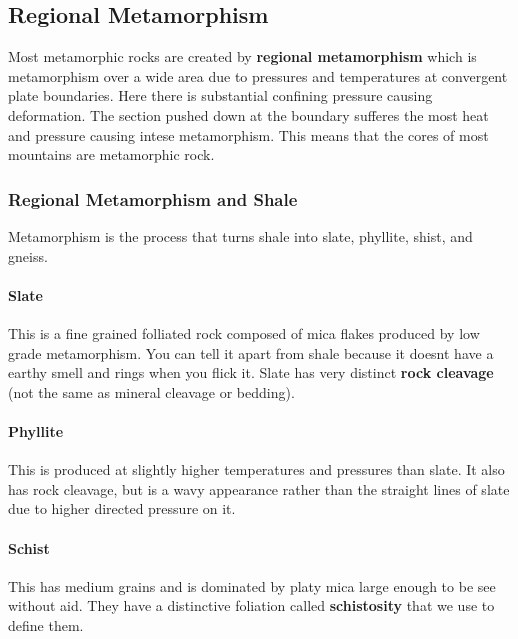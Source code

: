 \documentclass{article}
\begin{document}
\subsection{Regional Metamorphism} %
\label{sub:regional_metamorphism}
Most metamorphic rocks are created by \textbf{regional metamorphism} which is metamorphism over a wide area due to pressures and temperatures at convergent plate boundaries. Here there is substantial confining pressure causing deformation. The section pushed down at the boundary sufferes the most heat and pressure causing intese metamorphism. This means that the cores of most mountains are metamorphic rock.

\subsubsection{Regional Metamorphism and Shale} %
\label{sub:regional_metamorphism_and_shale}
Metamorphism is the process that turns shale into slate, phyllite, shist, and gneiss.

\paragraph{Slate} %
\label{par:slate}
This is a fine grained folliated rock composed of mica flakes produced by low grade metamorphism. You can tell it apart from shale because it doesnt have a earthy smell and rings when you flick it. Slate has very distinct \textbf{rock cleavage} (not the same as mineral cleavage or bedding).

\paragraph{Phyllite} %
\label{par:phyllite}
This is produced at slightly higher temperatures and pressures than slate. It also has rock cleavage, but is a wavy appearance rather than the straight lines of slate due to higher directed pressure on it.

\paragraph{Schist} %
\label{par:schist}
This has medium grains and is dominated by platy mica large enough to be see without aid. They have a distinctive foliation called \textbf{schistosity} that we use to define them.
\end{document}
